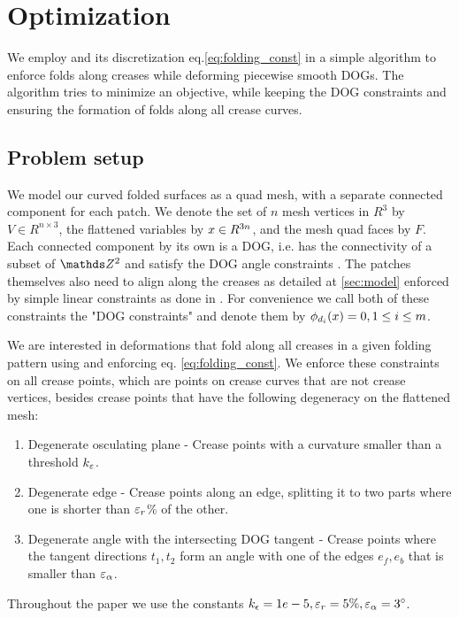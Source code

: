 \section{Optimization} \label{sec:implementation}
We employ  and its discretization eq.\eqref{eq:folding_const} in a simple algorithm to enforce folds along creases while deforming piecewise smooth DOGs. The algorithm tries to minimize an objective, while keeping the DOG constraints and ensuring the formation of folds along all crease curves.

\subsection{Problem setup}
We model our curved folded surfaces as a quad mesh, with a separate connected component for each patch. We denote the set of $n$ mesh vertices in $R^3$ by $V \in R^{n\times3}$, the flattened variables by $x \in R^{3n}$, and the mesh quad faces by $F$. Each connected component by its own is a DOG, i.e. has the connectivity of a subset of $\Z^2$ and satisfy the DOG angle constraints \cite{rabi18}. The patches themselves also need to align along the creases as detailed at \ref{sec:model} enforced by simple linear constraints as done in \cite{rabi2018shape}. For convenience we call both of these constraints the "DOG constraints" and denote them by $\phi_{d_i}(x) = 0, 1 \leq i \leq m$.

We are interested in deformations that fold along all creases in a given folding pattern using  and enforcing eq. \eqref{eq:folding_const}. We enforce these constraints on all crease points, which are points on crease curves that are not crease vertices, besides crease points that have the following degeneracy on the flattened mesh:
\begin{enumerate}
	\item Degenerate osculating plane  - Crease points with a curvature smaller than a threshold $k_\varepsilon$. \label{item:deg_osc}
	\item Degenerate edge - Crease points along an edge, splitting it to two parts where one is shorter than $\varepsilon_{r}$\% of the other. \label{item:deg_edge}
	\item Degenerate angle with the intersecting DOG tangent - Crease points where the tangent directions $t_1,t_2$ form an angle with one of the edges $e_f,e_b$ that is smaller than $\varepsilon_\alpha$. \label{item:deg_tan_angle}
\end{enumerate}
Throughout the paper we use the constants $k_\epsilon=1e-5, \varepsilon_r=5\%, \varepsilon_\alpha=3^{\circ}$.

